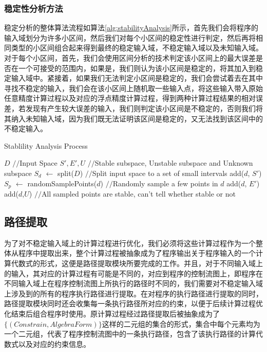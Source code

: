 \subsubsection{稳定性分析方法}

稳定分析的整体算法流程如算法\ref{alg:stabilityAnalysis}所示，首先我们会将程序的输入域划分为许多小区间，然后我们对每个小区间的稳定性进行判定，然后再将相同类型的小区间组合起来得到最终的稳定输入域，不稳定输入域以及未知输入域。对于每个小区间，首先，我们会使用区间分析的技术判定该小区间上的最大误差是否在一个可接受的范围内，如果是，我们则认为该小区间是稳定的，将其加入到稳定输入域中。紧接着，如果我们无法判定小区间是稳定的，我们会尝试着去在其中寻找不稳定的输入，我们会在该小区间上随机取一些输入点，将这些输入带入原始任意精度计算过程以及对应的浮点精度计算过程，得到两种计算过程结果的相对误差，若发现有产生较大误差的输入，我们则判定该小区间是不稳定的，否则我们将其纳入未知输入域，因为我们既无法证明该区间是稳定的，又无法找到该区间中的不稳定输入。

\begin{algorithm}[thb]
  \caption{Stablility Analysis Process}
  \label{alg:stabilityAnalysis}
\begin{algorithmic}[1]
\REQUIRE $D$ {{\footnotesize$//$}\small Input Space}
\ENSURE $S', E', U$ {{\footnotesize$//$}\small Stable subspace, Unstable subspace and Unknown subspace}
\STATE $S_d$ $\leftarrow$ split($D$) {{\footnotesize$//$}\small Split input space to a set of small intervals}
\STATE add($d$, $S'$)
\ELSE
\STATE $S_p$ $\leftarrow$ randomSamplePoints($d$) {{\footnotesize$//$}\small Randomly sample a few points in $d$}
\STATE add($d$, $E'$)
\ENDIF
\ENDFOR
\STATE add($d$,$U$) {{\footnotesize$//$}\small All sampled points are stable, can't tell whether stable or not}
\ENDIF
\ENDFOR
\end{algorithmic}
\end{algorithm}

\subsection{路径提取}
为了对不稳定输入域上的计算过程进行优化，我们必须将这些计算过程作为一个整体从程序中提取出来，整个计算过程被抽象成为了程序输出关于程序输入的一个计算代数式的形式，这便是路径提取模块所要完成的工作。并且，对于不同输入域上的输入，其对应的计算过程有可能是不同的，对应到程序的控制流图上，即程序在不同输入域上在程序控制流图上所执行的路径时不同的，我们需要对不稳定输入域上涉及到的所有的程序执行路径进行提取。在对程序的执行路径进行提取的同时，路径提取模块同时还会收集每一条执行路径所对应的约束，以便于后续计算过程优化结束后组合程序时使用。原计算过程经过路径提取后被抽象成为了$\{(Constrain, AlgebraForm)\}$这样的二元组的集合的形式，集合中每个元素均为一个二元组，代表了程序控制流图中的一条执行路径，包含了该执行路径的计算代数式以及对应的约束信息。

